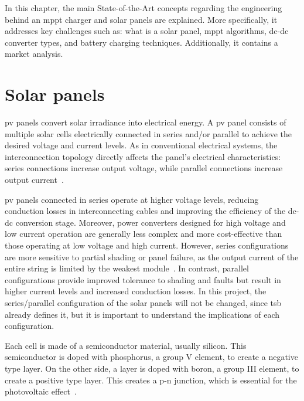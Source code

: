 \label{chap:soa}

In this chapter, the main State-of-the-Art concepts regarding the engineering behind an \acs{mppt} charger and solar panels are explained. More specifically, it addresses key challenges such as: what is a solar panel, \acs{mppt} algorithms, \acs{dc}-\acs{dc} converter types, and battery charging techniques. Additionally, it contains a market analysis.  


\section{Solar panels}

    \ac{pv} panels convert solar irradiance into electrical energy. A \acs{pv} panel consists of multiple solar cells electrically connected in series and/or parallel to achieve the desired voltage and current levels. As in conventional electrical systems, the interconnection topology directly affects the panel's electrical characteristics: series connections increase output voltage, while parallel connections increase output current~\cite{bendib_survey_mppt_methods}.

    \acs{pv} panels connected in series operate at higher voltage levels, reducing conduction losses in interconnecting cables and improving the efficiency of the \acs{dc}-\acs{dc} conversion stage. 
    Moreover, power converters designed for high voltage and low current operation are generally less complex and more cost-effective than those operating at low voltage and high current. 
    However, series configurations are more sensitive to partial shading or panel failure, as the output current of the entire string is limited by the weakest module~\cite{Shading_Effect_PV_Modules_2011}. 
    In contrast, parallel configurations provide improved tolerance to shading and faults but result in higher current levels and increased conduction losses.
    In this project, the series/parallel configuration of the solar panels will not be changed, since \ac{tsb} already defines it, but it is important to understand the implications of each configuration. 

    Each cell is made of a semiconductor material, usually silicon. This semiconductor is doped with phosphorus, a group V element, to create a negative type layer. On the other side, a layer is doped with boron, a group III element, to create a positive type layer. This creates a p-n junction, which is essential for the photovoltaic effect~\cite{photovoltaics_System_Design}.

